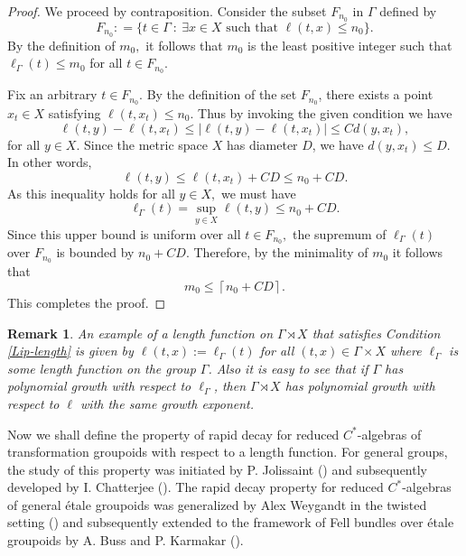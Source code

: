\documentclass[a4paper,11pt,reqno]{amsart}
\theoremstyle{plain}
\newtheorem{rem}[thm]{Remark}
\theoremstyle{mainthmstyle}
\theoremstyle{named}
\numberwithin{equation}{section}
\begin{document}
\begin{proof}
We proceed by contraposition. Consider the subset $F_{n_0}$ in $\Gamma$ defined by
\begin{equation*}
    F_{n_0} : = \{ t \in \Gamma\ :\ \exists x \in X \text{ such that } \ell(t, x) \le n_0 \}.
\end{equation*}
By the definition of $m_0,$ it follows that $m_0$ is the least positive integer such that $\ell_{\Gamma}(t) \le m_0$ for all $t \in F_{n_0}.$

\vspace{2mm}

Fix an arbitrary $t \in F_{n_0}$. By the definition of the set $F_{n_0}$, there exists a point $x_t \in X$ satisfying $\ell(t, x_t) \le n_0.$ Thus by invoking the given condition we have
\begin{equation*}
    \ell(t, y) - \ell(t, x_t) \le |\ell(t, y) - \ell(t, x_t)| \le C d(y, x_t),
\end{equation*}
for all $y \in X.$
Since the metric space $X$ has diameter $D$, we have $d(y, x_t) \le D.$ In other words,
\begin{equation*}
    \ell(t, y) \leq \ell(t, x_t) + CD \le n_0 + CD.
\end{equation*}
As this inequality holds for all $y \in X,$ we must have
\begin{equation*}
    \ell_{\Gamma}(t) = \sup_{y \in X} \ell(t, y) \le n_0 + CD.
\end{equation*}
Since this upper bound is uniform over all $t \in F_{n_0},$ the supremum of $\ell_{\Gamma}(t)$ over $F_{n_0}$ is bounded by $n_0 + CD.$ Therefore, by the minimality of $m_0$ it follows that
\begin{equation*}
    m_0 \leq \left \lceil n_0 + CD \right \rceil.
\end{equation*}
This completes the proof.
\end{proof}
\begin{rem}\label{grouplengthtogroupoidlength}
    An example of a length function on $\Gamma\rtimes X$ that satisfies Condition \ref{Lip-length} is given by $\ell(t,x):=\ell_{\Gamma}(t)$ for all $(t,x)\in\Gamma\times X$ where $\ell_{\Gamma}$ is some length function on the group $\Gamma$. Also it is easy to see that if $\Gamma$ has polynomial growth with respect to $\ell_{\Gamma}$, then $\Gamma\rtimes X$ has polynomial growth with respect to $\ell$ with the same growth exponent.
\end{rem}
Now we shall define the property of rapid decay for reduced $C^{\ast}$-algebras of transformation groupoids with respect to a length function. For general groups, the study of this property was initiated by P. Jolissaint (\cite{MR943303}) and subsequently developed by I. Chatterjee (\cites{ChatterjiRuane2005, Chatterji2016}). The rapid decay property for reduced $C^{\ast}$-algebras of general \'etale groupoids was generalized by Alex Weygandt in the twisted setting (\cite{Weygandt-2024-Rapid-decay-for-etale-gpd}) and subsequently extended to the framework of Fell bundles over \'etale groupoids by A. Buss and P. Karmakar (\cite{buss2026rapid}).
\end{document}
